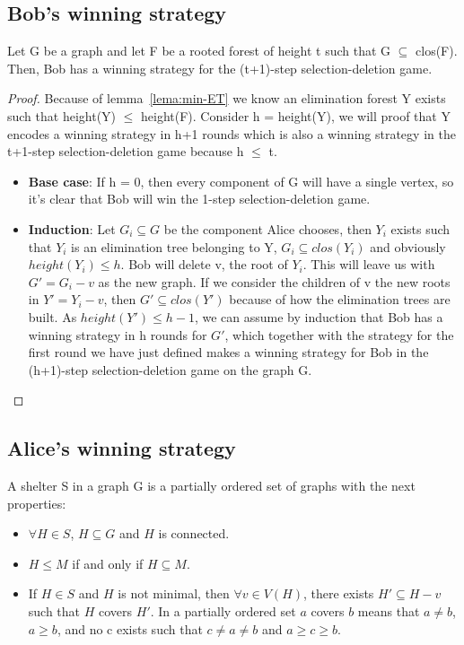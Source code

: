\subsection{Bob's winning strategy}
\begin{lemma}
Let G be a graph and let F be a rooted forest of height t such that G $\subseteq$ clos(F). Then, Bob has a winning strategy for the (t+1)-step selection-deletion game.
\label{lemma:Bob-win}
\end{lemma}
\begin{proof}
Because of lemma~\ref{lema:min-ET} we know an elimination forest Y exists such that height(Y) $\leq$ height(F).
Consider h = height(Y), we will proof that Y encodes a winning strategy in h+1 rounds which is also a winning strategy in the t+1-step selection-deletion game because h $\leq$ t.
\begin{itemize}
  \item \textbf{Base case}: If h = 0, then every component of G will have a single vertex, so it's clear that Bob will win the 1-step selection-deletion game.
  \item \textbf{Induction}: Let $G_i \subseteq G$ be the component Alice chooses, then $Y_i$ exists such that $Y_i$ is an elimination tree belonging to Y, $G_i \subseteq clos(Y_i)$ and obviously $height(Y_i) \leq h$. Bob will delete v, the root of $Y_i$. This will leave us with $G' = G_i - v$ as the new graph. If we consider the children of v the new roots in $Y' = Y_i - v$, then $G' \subseteq clos(Y')$ because of how the elimination trees are built. As $height(Y') \leq h-1$, we can assume by induction that Bob has a winning strategy in h rounds for $G'$, which together with the strategy for the first round we have just defined makes a winning strategy for Bob in the (h+1)-step selection-deletion game on the graph G.
\end{itemize}
\end{proof}

\subsection{Alice's winning strategy}
\begin{definition}
A shelter S in a graph G is a partially ordered set of graphs with the next properties:
\begin{itemize}
  \item $\forall H \in S$, $H \subseteq G$ and $H$ is connected.
  \item $H \leq M$ if and only if $H \subseteq M$.
  \item If $H \in S$ and $H$ is not minimal, then $\forall v \in V(H)$, there exists $H' \subseteq H - v$ such that $H$ covers $H'$. In a partially ordered set $a$ covers $b$ means that $a \neq b$, $a \geq b$, and no c exists such that $c \neq a \neq b$ and $a \geq c \geq b$.
\end{itemize}
\end{definition}

